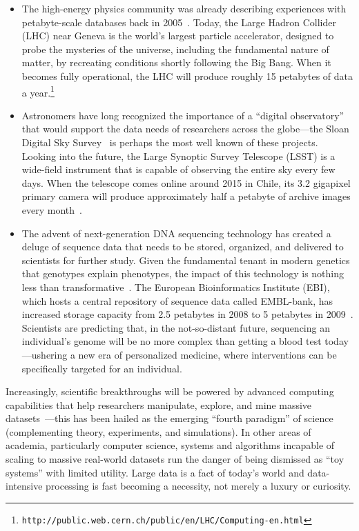 \begin{itemize}

\item The high-energy physics community was already describing
  experiences with petabyte-scale databases back in
  2005~\cite{Becla_Wang_2005}.  Today, the Large Hadron Collider (LHC)
  near Geneva is the world's largest particle accelerator, designed to
  probe the mysteries of the universe, including the fundamental
  nature of matter, by recreating conditions shortly following the Big
  Bang.  When it becomes fully operational, the LHC will produce
  roughly 15 petabytes of data a year.\footnote{\texttt{http://public.web.cern.ch/public/en/LHC/Computing-en.html}}

\item Astronomers have long recognized the importance of a ``digital
  observatory'' that would support the data needs of researchers
  across the globe---the Sloan Digital Sky
  Survey~\cite{Szalay_etal_2000} is perhaps the most well known of
  these projects.  Looking into the future, the Large Synoptic Survey
  Telescope (LSST) is a wide-field instrument that is capable of
  observing the entire sky every few days.  When the telescope comes
  online around 2015 in Chile, its 3.2 gigapixel primary camera will
  produce approximately half a petabyte of archive images every
  month~\cite{Becla_etal_2006}. 

\item The advent of next-generation DNA sequencing technology has
  created a deluge of sequence data that needs to be stored,
  organized, and delivered to scientists for further study.  Given the
  fundamental tenant in modern genetics that genotypes explain
  phenotypes, the impact of this technology is nothing less than
  transformative~\cite{Mardis_2008}.  The European Bioinformatics
  Institute (EBI), which hosts a central repository of sequence data
  called EMBL-bank, has increased storage capacity from 2.5 petabytes
  in 2008 to 5 petabytes in 2009~\cite{Southan_Cameron_2009}.
  Scientists are predicting that, in the not-so-distant future,
  sequencing an individual's genome will be no more complex than
  getting a blood test today---ushering a new era of personalized
  medicine, where interventions can be specifically targeted for an
  individual.

\end{itemize}

\noindent Increasingly, scientific breakthroughs will be powered by
advanced computing capabilities that help researchers manipulate,
explore, and mine massive datasets~\cite{Hey_etal_2009}---this has
been hailed as the emerging ``fourth paradigm'' of
science~\cite{Hey_etal_2009-Gray} (complementing theory, experiments,
and simulations).  In other areas of academia, particularly computer
science, systems and algorithms incapable of scaling to massive
real-world datasets run the danger of being dismissed as ``toy
systems'' with limited utility.  Large data is a fact of today's world
and data-intensive processing is fast becoming a necessity, not merely
a luxury or curiosity.

